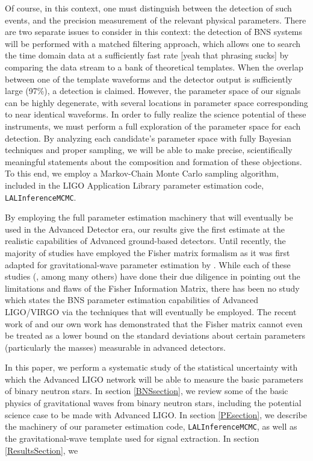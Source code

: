 \documentclass{emulateapj}
\newcommand{\carl}[1]{{\color{red}  #1}}
\begin{document}
Of course, in this context, one must distinguish between the detection of such events, and the precision measurement of the relevant physical parameters.   There are two separate issues to consider in this context: the detection of BNS systems will be performed with a matched filtering approach, which allows one to search the time domain data at a sufficiently fast rate \carl{[yeah that phrasing sucks]} by comparing the data stream to a bank of theoretical templates.  When the overlap between one of the template waveforms and the detector output is sufficiently large (97\%), a detection is claimed.  However, the parameter space of our signals can be highly degenerate, with several locations in parameter space corresponding to near identical waveforms.  In order to fully realize the science potential of these instruments, we must perform a full exploration of the parameter space for each detection.  By analyzing each candidate's parameter space with fully Bayesian techniques and proper sampling, we will be able to make precise, scientifically meaningful statements about the composition and formation of these objections.  To this end, we employ a Markov-Chain Monte Carlo sampling algorithm, included in the LIGO Application Library parameter estimation code, \texttt{LALInferenceMCMC}.  

By employing the full parameter estimation machinery that will eventually be used in the Advanced Detector era, our results give the first estimate at the realistic capabilities of Advanced ground-based detectors.  Until recently, the majority of studies have employed the Fisher matrix formalism as it was first adapted for gravitational-wave parameter estimation by \cite{FinnDetection}.  While each of these studies (\cite{PoissonWill,CutlerFlanagan,ArunPE}, among many others) have done their due diligence in pointing out the limitations and flaws of the Fisher Information Matrix, there has been no study which states the BNS parameter estimation capabilities of Advanced LIGO/VIRGO via the techniques that will eventually be employed.  The recent work of \cite{Vallisneri} and our own work \citep{Inadequacies} has demonstrated that the Fisher matrix cannot even be treated as a lower bound on the standard deviations about certain parameters (particularly the masses) measurable in advanced detectors.

In this paper, we perform a systematic study of the statistical uncertainty with which the Advanced LIGO network will be able to measure the basic parameters of binary neutron stars.  In section \ref{BNSsection}, we review some of the basic physics of gravitational waves from binary neutron stars, including the potential science case to be made with Advanced LIGO.  In section \ref{PEsection}, we describe the machinery of our parameter estimation code, \texttt{LALInferenceMCMC}, as well as the gravitational-wave template used for signal extraction.   In section \ref{ResultsSection}, we 
\end{document}
